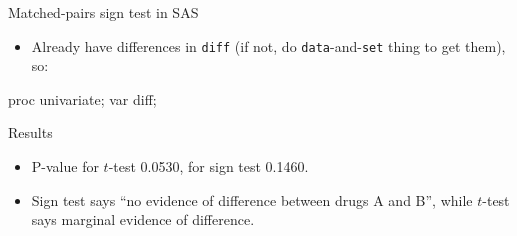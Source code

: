 \documentclass[unknownkeysallowed]{beamer}\usepackage[]{graphicx}\usepackage[]{color}
\begin{document}
\begin{frame}[fragile]{Matched-pairs sign test in SAS}


  \begin{itemize}
  \item Already have differences in \texttt{diff} (if not, do
    \texttt{data}-and-\texttt{set} thing to get them), so:
  \end{itemize}
  
\begin{Sascode}[store=ihx]
proc univariate;
  var diff;  
\end{Sascode}


  
\end{frame}



\begin{frame}[fragile]{Results}
  
  \begin{itemize}
    \item P-value for $t$-test 0.0530, for sign test 0.1460.
    \item Sign test says ``no evidence of difference between drugs A
      and B'', while $t$-test says marginal evidence of difference.
  \end{itemize}
  
\end{frame}
\end{document}
